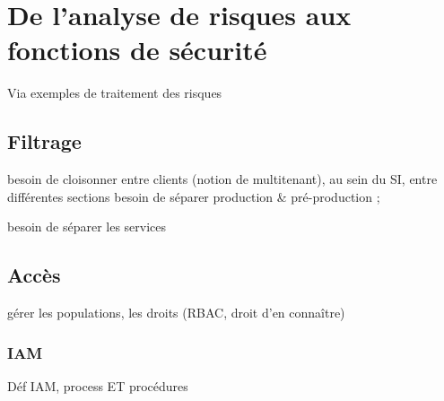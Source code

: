 \section{De l’analyse de risques aux fonctions de sécurité}
Via exemples de traitement des risques 
\subsection{Filtrage}

besoin de cloisonner entre clients (notion de multitenant), au sein du SI, entre différentes sections besoin de séparer production \& pré-production ; 

besoin de séparer les services


\subsection{Accès}
gérer les populations, les droits (RBAC, droit d’en connaître)
\subsubsection{IAM}
Déf IAM, process ET procédures

